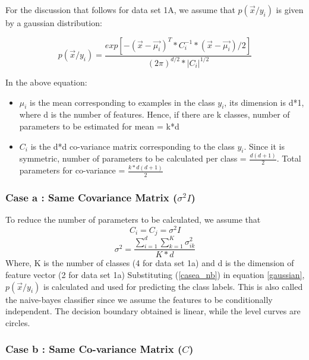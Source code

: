 \documentclass[11pt,a4paper]{article}
\newcommand{\noi}{\noindent}
\begin{document}
\noi
For the discussion that follows for data set 1A, we assume that $p(\vec{x}/y_{i})$ is given by a gaussian distribution:

\begin{equation}
\label{gaussian}
    p(\vec{x}/y_{i})=\frac{exp[-(\vec{x}-\vec{\mu_{i}})^{T}*C_{i}^{-1}*(\vec{x}-\vec{\mu_{i}})/2]}{(2\pi)^{d/2}*|C_{i}|^{1/2}}
\end{equation}

\noi
In the above equation: 

\begin{itemize}
    \item $\mu_{i}$ is the mean corresponding to examples in the class $y_{i}$, its dimension is d*1, where d is the number of features. Hence, if there are k classes, number of parameters to be estimated for mean = k*d
    \item $C_{i}$ is the d*d co-variance matrix corresponding to the class $y_{i}$. Since it is symmetric, number of parameters to be calculated per class = $\frac{d(d+1)}{2}$. Total parameters for co-variance = $\frac{k*d(d+1)}{2}$
\end{itemize}

\subsubsection{Case a : Same Covariance Matrix ($\sigma^2I$)}

To reduce the number of parameters to be calculated, we assume that
\begin{equation}
    C_{i}=C_{j}=\sigma^{2}I
\end{equation}
\begin{equation}
\label{casea_nb}
    \sigma^{2}=\frac{\sum_{i=1}^{d}\sum_{k=1}^{K}\sigma^{2}_{ik}}{K*d}
\end{equation}
Where, K is the number of classes (4 for data set 1a) and d is the dimension of feature vector (2 for data set 1a)
\noi
Substituting (\ref{casea_nb}) in equation \ref{gaussian}, $p(\vec{x}/y_{i})$ is calculated and used for predicting the class labels. 
This is also called the naive-bayes classifier since we assume the features to be conditionally independent. 
The decision boundary obtained is linear, while the level curves are circles. 

\subsubsection{Case b : Same Co-variance Matrix ($C$)}
\end{document}
